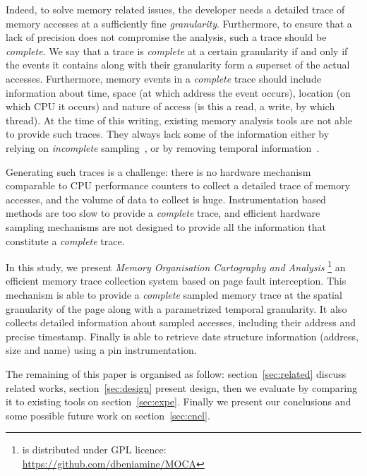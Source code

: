 Indeed, to solve memory related issues, the developer needs a detailed trace of memory
accesses at a sufficiently fine \emph{granularity}. Furthermore, to ensure that a lack of precision
does not compromise the analysis, such a trace should be \emph{complete}. We say that a trace is
\emph{complete} at a certain granularity if and only if the events it contains along with their granularity
form a superset of the actual accesses. Furthermore, memory events in a \emph{complete} trace should
include information about time, space (at which address the event occurs),
location (on which CPU it occurs) and nature of access (is this
a read, a write, by which thread).
%
At the time of this writing, existing memory analysis tools are not able to provide such traces. They
always lack some of the information either by relying on \emph{incomplete}
sampling~\cite{Liu14Tool,Lachaize12MemProf}, or by
removing temporal information~\cite{Beniamine15TABARNACRR}.

Generating such traces is a challenge: there is no hardware mechanism
comparable to CPU performance counters to collect a detailed trace of memory accesses, and the volume
of data to collect is huge. Instrumentation based methods are too slow
to provide a \emph{complete} trace, and efficient hardware sampling mechanisms are not designed
to provide all the information that constitute a \emph{complete} trace.

In this study, we present \emph{Memory Organisation Cartography and Analysis}
\footnote{\Moca is distributed under GPL licence:\\
    \url{https://github.com/dbeniamine/MOCA}}
an efficient memory trace collection system based on page fault interception.
This mechanism is able to provide a \emph{complete} sampled memory trace at
the spatial granularity of the page along with a parametrized temporal granularity.
It also collects detailed information about sampled accesses, including their address and
precise timestamp. Finally \Moca is able to retrieve date structure
information (address, size and name) using a pin instrumentation.

The remaining of this paper is organised as follow: section~\ref{sec:related}
discuss related works, section~\ref{sec:design} present \Moca design, then we
evaluate \Moca by comparing it to existing tools on section~\ref{sec:expe}.
Finally we present our conclusions and some possible future work on
section~\ref{sec:cncl}.
